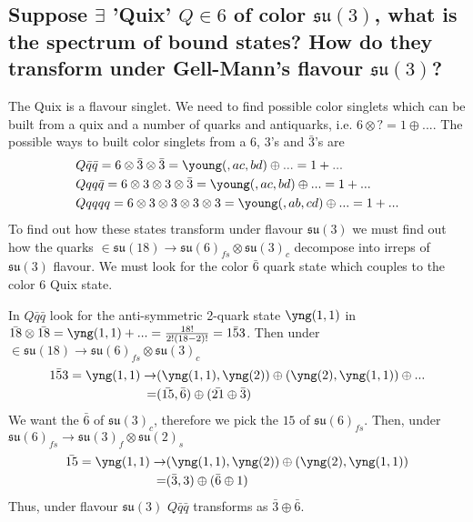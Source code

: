 \documentclass[main.tex]{subfiles}
\begin{document}
\subsection{Suppose $\exists$ 'Quix' $Q\in6$ of color $\mathfrak{su}(3)$, what is the spectrum of bound states? How do they transform under Gell-Mann's flavour $\mathfrak{su}(3)$?}
The Quix is a flavour singlet. We need to find possible color singlets which can be built from a quix and a number of quarks and antiquarks, i.e. $6\otimes?=1\oplus...$.
The possible ways to built color singlets from a $6$, $3$'s and $\bar{3}$'s are
\begin{align}
&Q\bar{q}\bar{q}=6\otimes\bar{3}\otimes\bar{3}=\young(\hfil \hfil,ac,bd)\oplus...=1+...\\
&Qqq\bar{q}=6\otimes3\otimes3\otimes\bar{3}=\young(\hfil \hfil,ac,bd)\oplus...=1+...\\
&Qqqqq=6\otimes3\otimes3\otimes3\otimes3=\young(\hfil \hfil,ab,cd)\oplus...=1+...
\end{align}
To find out how these states transform under flavour $\mathfrak{su}(3)$ we must find out how the quarks $\in\mathfrak{su}(18)\rightarrow\mathfrak{su}(6)_{fs}\otimes\mathfrak{su}(3)_{c}$ decompose into irreps of $\mathfrak{su}(3)$ flavour. We must look for the color $\bar{6}$ quark state which couples to the color $6$ Quix state.

In $Q\bar{q}\bar{q}$ look for the anti-symmetric 2-quark state $\yng(1,1)$ in $\bar{18}\otimes\bar{18}=\yng(1,1)+...=\frac{18!}{2!(18-2)!}=\bar{153}$. Then under $\in\mathfrak{su}(18)\rightarrow\mathfrak{su}(6)_{fs}\otimes\mathfrak{su}(3)_{c}$
\begin{align}
\bar{153}=\yng(1,1)\rightarrow&(\yng(1,1),\yng(2))\oplus(\yng(2),\yng(1,1))\oplus...\\
=&(\bar{15},\bar{6})\oplus(\bar{21}\oplus\bar{3})
\end{align}
We want the $\bar{6}$ of $\mathfrak{su}(3)_c$, therefore we pick the $15$ of $\mathfrak{su}(6)_{fs}$. Then, under $\mathfrak{su}(6)_{fs}\rightarrow\mathfrak{su}(3)_f\otimes\mathfrak{su}(2)_s$
\begin{align}
\bar{15}=\yng(1,1)\rightarrow&(\yng(1,1),\yng(2))\oplus(\yng(2),\yng(1,1))\\
=&(\bar{3},3)\oplus(\bar{6}\oplus1)
\end{align}
Thus, under flavour $\mathfrak{su}(3)$ $Q\bar{q}\bar{q}$ transforms as $\bar{3}\oplus\bar{6}$.
\end{document}

